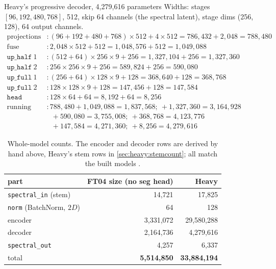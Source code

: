 \begin{worked}[label={we:heavy:decoder}]{Heavy's progressive decoder, 4,279,616 parameters}
Widths: stages $[96,192,480,768]$,  512, skip 64 channels (the spectral latent), stage dims
(256, 128), 64 output channels.
\begin{align*}
\text{projections} &: (96+192+480+768)\times512 + 4\times512 = 786{,}432 + 2{,}048 = 788{,}480\\
\text{fuse} &: 2{,}048\times512 + 512 = 1{,}048{,}576 + 512 = 1{,}049{,}088\\
\texttt{up\_half}\ 1 &: (512+64)\times256\times9 + 256 = 1{,}327{,}104 + 256 = 1{,}327{,}360\\
\texttt{up\_half}\ 2 &: 256\times256\times9 + 256 = 589{,}824 + 256 = 590{,}080\\
\texttt{up\_full}\ 1 &: (256+64)\times128\times9 + 128 = 368{,}640 + 128 = 368{,}768\\
\texttt{up\_full}\ 2 &: 128\times128\times9 + 128 = 147{,}456 + 128 = 147{,}584\\
\texttt{head} &: 128\times64 + 64 = 8{,}192 + 64 = 8{,}256\\[3pt]
\text{running total} &: 788{,}480+1{,}049{,}088 = 1{,}837{,}568;\ +1{,}327{,}360 = 3{,}164{,}928\\
&\phantom{:}\ +590{,}080 = 3{,}755{,}008;\ +368{,}768 = 4{,}123{,}776\\
&\phantom{:}\ +147{,}584 = 4{,}271{,}360;\ +8{,}256 = 4{,}279{,}616
\end{align*}
\end{worked}

\begin{table}[htbp]
\centering
\begin{tabular}{lrr}
\toprule
part & FT04 size (no seg head) & Heavy\\
\midrule
\texttt{spectral\_in} (stem) & 14,721 & 17,825\\
\texttt{norm} (BatchNorm, $2D$) & 64 & 128\\
encoder & 3,331,072 & 29,580,288\\
decoder & 2,164,736 & 4,279,616\\
\texttt{spectral\_out} & 4,257 & 6,337\\
\midrule
total & \textbf{5,514,850} & \textbf{33,884,194}\\
\bottomrule
\end{tabular}
\caption{Whole-model counts. The encoder and decoder rows are derived by hand above, Heavy's stem rows in
\cref{sec:heavy:stemcount}; all match the built models \tagC.}
\label{tab:heavy:total}
\end{table}

